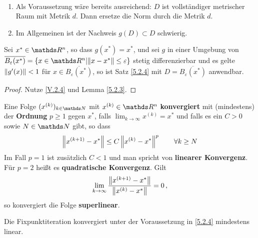 \begin{Beme}
  \label{5.2.5}~
  \begin{enumerate}[1)]
  \item Als Voraussetzung wäre bereits ausreichend:
    $D$ ist vollständiger metrischer Raum mit Metrik $d$.
    Dann ersetze die Norm durch die Metrik $d$.
  \item Im Allgemeinen ist der Nachweis $g(D)\subset D$ schwierig.
  \end{enumerate}
\end{Beme}

\begin{Fole}
  \label{5.2.6}
  Sei $x^{*}\in \R^n$, so dass $g(x^{*})=x^{*}$, 
  und sei $g$ in einer Umgebung von 
  $\overline{B_\varepsilon(x^{*})}
  =\left\{ x\in \R^n \middle\vert \nn[x-x^{*}]\leq \varepsilon \right\}$
  stetig differenzierbar und es gelte 
  $\nn[g'(x)]<1$ für $x\in \overline{B_\varepsilon(x^{*})}$,
  so ist Satz \ref{5.2.4} mit $D=\overline{B_\varepsilon(x^{*})}$ anwendbar.
\end{Fole}

\begin{proof}
  Nutze \eqref{V.2.4} und Lemma \ref{5.2.3}.
\end{proof}



\begin{Defe}
  \label{5.3.1}
  Eine Folge $(x^{(k)})_{k\in\N} $ mit $x^{(k)}\in\R^n$ \textbf{konvergiert} mit (mindestens)
  der \textbf{Ordnung} 
  $p\geq 1$ gegen $x^{*}$, falls $\lim_{k\to\infty}x^{(k)}=x^{*}$
  und falls es ein $C>0$ sowie $N\in\N$ gibt, so dass
  \begin{gather*}
    \nn[x^{(k+1)}-x^{*}] \leq C \nn[x^{(k)}-x^{*}]^p\qquad \forall k\geq N 
  \end{gather*}
  Im Fall $p=1$ ist zusätzlich $C<1$ und man spricht von \textbf{linearer Konvergenz}.
  Für $p=2$ heißt es 
  \textbf{quadratische Konvergenz}. 
  Gilt 
  \begin{gather*} 
    \lim_{k\to\infty}\frac{\nn[x^{(k+1)}-x^{*}]}{\nn[x^{(k)}-x^{*}]}=0\, ,
  \end{gather*} so konvergiert die Folge \textbf{superlinear}.
\end{Defe}

\begin{Beme}
  Die Fixpunktiteration konvergiert unter der Voraussetzung in \ref{5.2.4} mindestens linear.
\end{Beme}

